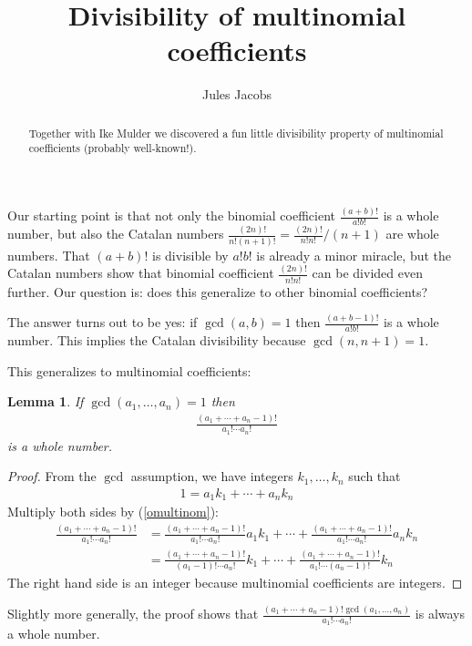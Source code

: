 

\newcommand{\tac}[1]{\lstinline[mathescape]~#1~}
\newcommand{\ciff}{\ \leftrightarrow\ }
\newcommand{\hyp}{\tac{H}}
\newcommand{\hypB}{\tac{G}}
\newcommand{\var}{\tac{x}}
\newcommand{\varB}{\tac{y}}

\newtheorem*{nlemma}{Lemma}


\title{Divisibility of multinomial coefficients}
\author{Jules Jacobs}


\maketitle
\begin{abstract}
  Together with Ike Mulder we discovered a fun little divisibility property of multinomial coefficients (probably well-known!).
\end{abstract}

Our starting point is that not only the binomial coefficient $\frac{(a+b)!}{a! b!}$ is a whole number,
but also the Catalan numbers $\frac{(2n)!}{n! (n+1)!} = \frac{(2n)!}{n!n!} / (n+1)$ are whole numbers.
That $(a+b)!$ is divisible by $a! b!$ is already a minor miracle, but the Catalan numbers show that binomial coefficient $\frac{(2n)!}{n!n!}$ can be divided even further. Our question is: does this generalize to other binomial coefficients?

The answer turns out to be yes: if $\gcd(a, b) = 1$ then $\frac {(a + b - 1)!}{a! b!}$ is a whole number.
This implies the Catalan divisibility because $\gcd(n,n+1) = 1$.

This generalizes to multinomial coefficients:

\begin{nlemma}
  If $\gcd(a_1, \dots, a_n) = 1$ then
  \begin{align}
    \label{omultinom}
    \frac
      {(a_1 + \cdots + a_n - 1)!}
      {a_1! \cdots a_n!}
  \end{align}
  is a whole number.
\end{nlemma}
\begin{proof}
  From the $\gcd$ assumption, we have integers $k_1,\dots,k_n$ such that
  \begin{align*}
    1 = a_1 k_1 + \cdots + a_n k_n
  \end{align*}
  Multiply both sides by (\ref{omultinom}):
  \begin{align*}
    \frac
      {(a_1 + \cdots + a_n - 1)!}
      {a_1! \cdots a_n!} &=
        \frac
          {(a_1 + \cdots + a_n - 1)!}
          {a_1! \cdots a_n!} a_1 k_1
        + \cdots +
        \frac
          {(a_1 + \cdots + a_n - 1)!}
          {a_1! \cdots a_n!} a_n k_n \\
      &=
      \frac
          {(a_1 + \cdots + a_n - 1)!}
          {(a_1 - 1)! \cdots a_n!} k_1
        + \cdots +
        \frac
          {(a_1 + \cdots + a_n - 1)!}
          {a_1! \cdots (a_n - 1)!} k_n
  \end{align*}
  The right hand side is an integer because multinomial coefficients are integers.
\end{proof}

Slightly more generally, the proof shows that
  $\frac
    {(a_1 + \cdots + a_n - 1)! \gcd(a_1, \dots, a_n)}
    {a_1! \cdots a_n!}$
is always a whole number.
